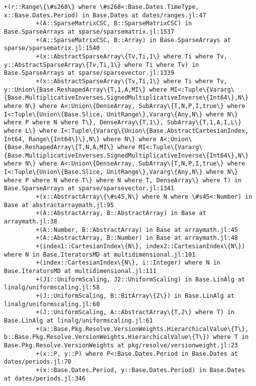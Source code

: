 \documentclass[11pt]{article}
\begin{document}
\begin{Verbatim}[commandchars=\\\{\}]
         +(r::Range\{\#s268\} where \#s268<:Base.Dates.TimeType, x::Base.Dates.Period) in Base.Dates at dates/ranges.jl:47
         +(A::SparseMatrixCSC, B::SparseMatrixCSC) in Base.SparseArrays at sparse/sparsematrix.jl:1537
         +(A::SparseMatrixCSC, B::Array) in Base.SparseArrays at sparse/sparsematrix.jl:1540
         +(x::AbstractSparseArray\{Tv,Ti,1\} where Ti where Tv, y::AbstractSparseArray\{Tv,Ti,1\} where Ti where Tv) in Base.SparseArrays at sparse/sparsevector.jl:1339
         +(x::AbstractSparseArray\{Tv,Ti,1\} where Ti where Tv, y::Union\{Base.ReshapedArray\{T,1,A,MI\} where MI<:Tuple\{Vararg\{Base.MultiplicativeInverses.SignedMultiplicativeInverse\{Int64\},N\} where N\} where A<:Union\{DenseArray, SubArray\{T,N,P,I,true\} where I<:Tuple\{Union\{Base.Slice, UnitRange\},Vararg\{Any,N\} where N\} where P where N where T\}, DenseArray\{T,1\}, SubArray\{T,1,A,I,L\} where L\} where I<:Tuple\{Vararg\{Union\{Base.AbstractCartesianIndex, Int64, Range\{Int64\}\},N\} where N\} where A<:Union\{Base.ReshapedArray\{T,N,A,MI\} where MI<:Tuple\{Vararg\{Base.MultiplicativeInverses.SignedMultiplicativeInverse\{Int64\},N\} where N\} where A<:Union\{DenseArray, SubArray\{T,N,P,I,true\} where I<:Tuple\{Union\{Base.Slice, UnitRange\},Vararg\{Any,N\} where N\} where P where N where T\} where N where T, DenseArray\} where T) in Base.SparseArrays at sparse/sparsevector.jl:1341
         +(x::AbstractArray\{\#s45,N\} where N where \#s45<:Number) in Base at abstractarraymath.jl:95
         +(A::AbstractArray, B::AbstractArray) in Base at arraymath.jl:38
         +(A::Number, B::AbstractArray) in Base at arraymath.jl:45
         +(A::AbstractArray, B::Number) in Base at arraymath.jl:48
         +(index1::CartesianIndex\{N\}, index2::CartesianIndex\{N\}) where N in Base.IteratorsMD at multidimensional.jl:101
         +(index::CartesianIndex\{N\}, i::Integer) where N in Base.IteratorsMD at multidimensional.jl:111
         +(J1::UniformScaling, J2::UniformScaling) in Base.LinAlg at linalg/uniformscaling.jl:58
         +(J::UniformScaling, B::BitArray\{2\}) in Base.LinAlg at linalg/uniformscaling.jl:60
         +(J::UniformScaling, A::AbstractArray\{T,2\} where T) in Base.LinAlg at linalg/uniformscaling.jl:61
         +(a::Base.Pkg.Resolve.VersionWeights.HierarchicalValue\{T\}, b::Base.Pkg.Resolve.VersionWeights.HierarchicalValue\{T\}) where T in Base.Pkg.Resolve.VersionWeights at pkg/resolve/versionweight.jl:23
         +(x::P, y::P) where P<:Base.Dates.Period in Base.Dates at dates/periods.jl:70
         +(x::Base.Dates.Period, y::Base.Dates.Period) in Base.Dates at dates/periods.jl:346

\end{Verbatim}
\end{document}
